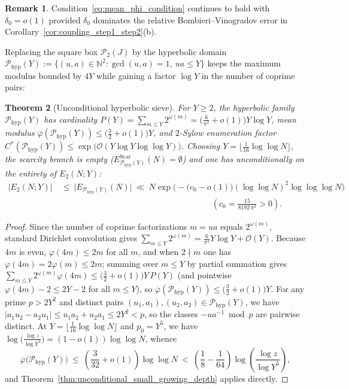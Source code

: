 \documentclass[11pt, a4paper]{article}
\theoremstyle{plain}
\newtheorem{theorem}{Theorem}[section]
\theoremstyle{definition}
\newtheorem{remark}[theorem]{Remark}
\newcommand{\N}{\mathbb{N}}
\begin{document}
\begin{remark}
Condition~\eqref{eq:mean_phi_condition} continues to hold with $\delta_0=o(1)$ provided $\delta_0$ dominates the relative Bombieri--Vinogradov error in Corollary~\ref{cor:coupling_step1_step2}(b).
\end{remark}

Replacing the square box $\mathcal{P}_2(J)$ by the hyperbolic domain\linebreak $\mathcal{P}_{\mathrm{hyp}}(Y):=\{(u,a)\in\N^{2}:\allowbreak\gcd(u,a)=1,\ ua\le Y\}$ keeps the maximum modulus bounded by $4Y$ while gaining a factor $\log Y$ in the number of coprime pairs:

\begin{theorem}[Unconditional hyperbolic sieve]\label{thm:hyperbolic_scarcity_free}
For $Y\ge2$, the hyperbolic family $\mathcal{P}_{\mathrm{hyp}}(Y)$ has cardinality $P(Y)=\sum_{m\le Y}2^{\omega(m)}=\big(\frac{6}{\pi^{2}}+o(1)\big)Y\log Y$, mean modulus $\overline{\varphi}(\mathcal{P}_{\mathrm{hyp}}(Y))\le\big(\frac32+o(1)\big)Y$, and $2$-Sylow enumeration factor $C^{\ast}(\mathcal{P}_{\mathrm{hyp}}(Y))\le\exp\big(\mathcal{O}(Y\log Y\log\log Y)\big)$. Choosing $Y=\lfloor\frac{1}{16}\log\log N\rfloor$, the scarcity branch is empty ($E_{\mathcal{P}_{\mathrm{hyp}}(Y)}^{\mathrm{Scar}}(N)=\emptyset$) and one has unconditionally on the entirety of $E_2(N;Y)$:
\begin{equation}\label{eq:hyperbolic_unconditional_bound}
\begin{split}
\big|E_2(N;Y)\big|\ &\le\ \big|E_{\mathcal{P}_{\mathrm{hyp}}(Y)}(N)\big|\ \ll\ N\exp\!\Big(-\big(c_0-o(1)\big)(\log\log N)^{2}\log\log\log N\Big)\\
&\qquad\qquad\qquad\qquad\qquad\qquad\qquad\qquad\qquad\left(c_0=\frac{15}{8192\,\pi^{2}}>0\right).
\end{split}
\end{equation}
\end{theorem}
\begin{proof}
Since the number of coprime factorizations $m=ua$ equals $2^{\omega(m)}$, standard Dirichlet convolution gives $\sum_{m\le Y}2^{\omega(m)}=\frac{6}{\pi^{2}}Y\log Y+\mathcal{O}(Y)$. Because $4m$ is even, $\varphi(4m)\le 2m$ for all $m$, and when $2\nmid m$ one has $\varphi(4m)=2\varphi(m)\le 2m$; summing over $m\le Y$ by partial summation gives $\sum_{m\le Y}2^{\omega(m)}\varphi(4m)\le\big(\frac32+o(1)\big)Y\,P(Y)$ (and pointwise $\varphi(4m)-2\le 2Y-2$ for all $m\le Y$), so $\overline{\varphi}(\mathcal{P}_{\mathrm{hyp}}(Y))\le\big(\frac32+o(1)\big)Y$. For any prime $p>2Y^{2}$ and distinct pairs $(u_1,a_1),(u_2,a_2)\in\mathcal{P}_{\mathrm{hyp}}(Y)$, we have $|a_1 u_2-a_2 u_1|\le u_1 a_2+u_2 a_1\le 2Y^{2}<p$, so the classes $-ua^{-1}\bmod p$ are pairwise distinct. At $Y=\lfloor\frac{1}{16}\log\log N\rfloor$ and $p_0=Y^{5}$, we have $\log\big(\frac{\log z}{\log Y^{5}}\big)=(1-o(1))\log\log N$, whence
$$\overline{\varphi}\big(\mathcal{P}_{\mathrm{hyp}}(Y)\big)\ \le\ \left(\frac{3}{32}+o(1)\right)\log\log N\ <\ \left(\frac{1}{8}-\frac{1}{64}\right)\log\!\left(\frac{\log z}{\log Y^{5}}\right),$$
and Theorem~\ref{thm:unconditional_small_growing_depth} applies directly.
\end{proof}
\end{document}
